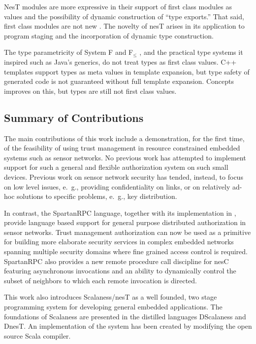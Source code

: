 NesT modules are more expressive in their support of first class modules as values and the
possibility of dynamic construction of ``type exports.'' That said, first class modules are not
new \cite{99620,ancona01calculus}. The novelty of nesT arises in its application to program
staging and the incorporation of dynamic type construction.

The type parametricity of System F and F$_\le$ \cite{Cardelli-1985}, and the practical type
systems it inspired such as Java's generics, do not treat types as first class values. C++
templates support types as meta values in template expansion, but type safety of generated code
is not guaranteed without full template expansion. Concepts \cite{gregor06:_concepts} improves
on this, but types are still not first class values.

\subsection{Summary of Contributions}

The main contributions of this work include a demonstration, for the first time, of the
feasibility of using trust management in resource constrained embedded systems such as sensor
networks. No previous work has attempted to implement support for such a general and flexible
authorization system on such small devices. Previous work on sensor network security has tended,
instead, to focus on low level issues, e.~g., providing confidentiality on links, or on
relatively ad-hoc solutions to specific problems, e.~g., key distribution.

In contrast, the SpartanRPC language, together with its implementation in \Sprocket, provide
language based support for general purpose distributed authorization in sensor networks. Trust
management authorization can now be used as a primitive for building more elaborate security
services in complex embedded networks spanning multiple security domains where fine grained
access control is required. SpartanRPC also provides a new remote procedure call discipline for
nesC featuring asynchronous invocations and an ability to dynamically control the subset of
neighbors to which each remote invocation is directed.

This work also introduces Scalaness/nesT as a well founded, two stage programming system for
developing general embedded applications. The foundations of Scalaness are presented in the
distilled languages DScalaness and DnesT. An implementation of the system has been created by
modifying the open source Scala compiler.

